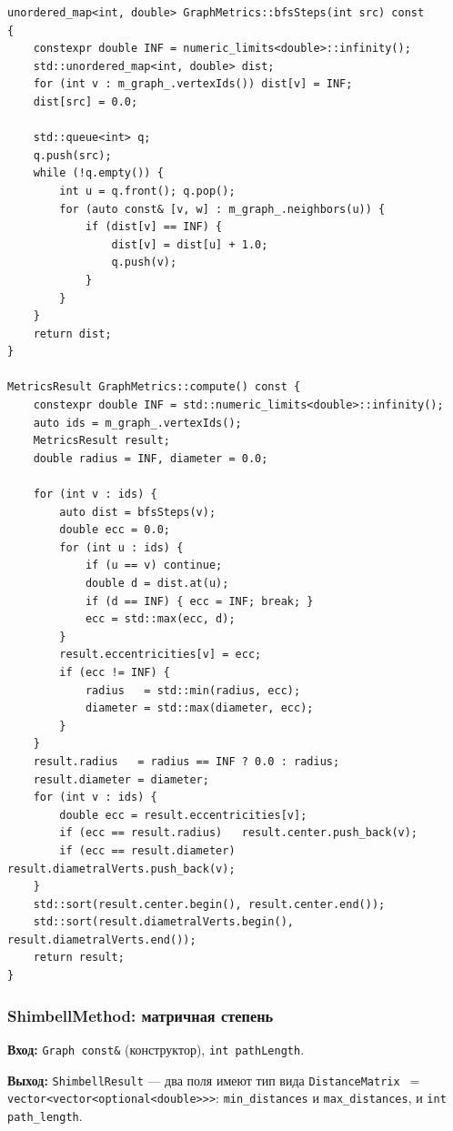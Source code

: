 \begin{lstlisting}[style=cppstyle, caption={BFS и вычисление метрик (GraphMetrics.cc)}]
unordered_map<int, double> GraphMetrics::bfsSteps(int src) const 
{
    constexpr double INF = numeric_limits<double>::infinity();
    std::unordered_map<int, double> dist;
    for (int v : m_graph_.vertexIds()) dist[v] = INF;
    dist[src] = 0.0;

    std::queue<int> q;
    q.push(src);
    while (!q.empty()) {
        int u = q.front(); q.pop();
        for (auto const& [v, w] : m_graph_.neighbors(u)) {
            if (dist[v] == INF) {
                dist[v] = dist[u] + 1.0;
                q.push(v);
            }
        }
    }
    return dist;
}

MetricsResult GraphMetrics::compute() const {
    constexpr double INF = std::numeric_limits<double>::infinity();
    auto ids = m_graph_.vertexIds();
    MetricsResult result;
    double radius = INF, diameter = 0.0;

    for (int v : ids) {
        auto dist = bfsSteps(v);
        double ecc = 0.0;
        for (int u : ids) {
            if (u == v) continue;
            double d = dist.at(u);
            if (d == INF) { ecc = INF; break; }
            ecc = std::max(ecc, d);
        }
        result.eccentricities[v] = ecc;
        if (ecc != INF) {
            radius   = std::min(radius, ecc);
            diameter = std::max(diameter, ecc);
        }
    }
    result.radius   = radius == INF ? 0.0 : radius;
    result.diameter = diameter;
    for (int v : ids) {
        double ecc = result.eccentricities[v];
        if (ecc == result.radius)   result.center.push_back(v);
        if (ecc == result.diameter) result.diametralVerts.push_back(v);
    }
    std::sort(result.center.begin(), result.center.end());
    std::sort(result.diametralVerts.begin(), result.diametralVerts.end());
    return result;
}
\end{lstlisting}

\subsubsection{ShimbellMethod: матричная степень}

\textbf{Вход:} \texttt{Graph const\&} (конструктор), \texttt{int pathLength}.

\textbf{Выход:} \texttt{ShimbellResult} --- два поля имеют тип вида
\texttt{DistanceMatrix}~$=$~\\\texttt{vector<vector<optional<double>>>}:
\texttt{min\_distances} и \texttt{max\_distances}, и \texttt{int path\_length}.


